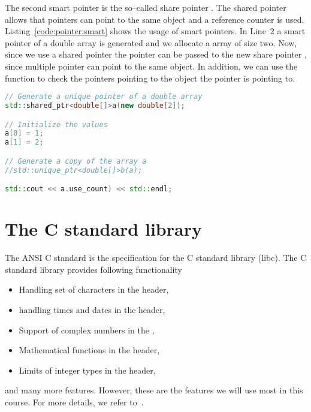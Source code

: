 The second smart pointer is the so--called share pointer . The shared pointer allows that pointers can point to the same object and a reference counter is used. Listing~\ref{code:pointer:smart} shows the usage of smart pointers. In Line~2 a smart pointer of a double array is generated and we allocate a array of size two. Now, since we use a shared pointer the pointer  can be passed to the new share pointer , since multiple pointer can point to the same object. In addition, we can use the function  to check the pointers pointing to the object the pointer  is pointing to. 


\begin{lstlisting}[language=c++,caption={Using the smart unique pointer.
\label{code:pointer:smart}},float,floatplacement=tb]
// Generate a unique pointer of a double array
std::shared_ptr<double[]>a(new double[2]);

// Initialize the values
a[0] = 1;
a[1] = 2;

// Generate a copy of the array a
//std::unique_ptr<double[]>b(a);

std::cout << a.use_count) << std::endl;
\end{lstlisting}


\newpage
\theendnotes

\chapter{The C standard library}
\label{chapter:cpp:lib}
The ANSI C standard is the specification for the C standard library (libc). The C standard library provides following functionality
\begin{itemize}
\item Handling set of characters in the  header,
\item handling times and dates in the  header,
\item Support of complex numbers in the ,
\item Mathematical functions in the  header,
\item Limits of integer types in the  header,
\end{itemize}
and many more features. However, these are the features we will use most in this course. For more details, we refer to~\cite{josuttis2012c++}.

